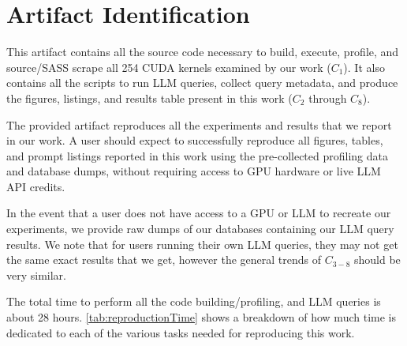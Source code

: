 \section{Artifact Identification}


\newartifact

\artrel
This artifact contains all the source code necessary to build, execute, profile, and source/SASS scrape all 254 CUDA kernels examined by our work ($C_1$).
It also contains all the scripts to run LLM queries, collect query metadata, and produce the figures, listings, and results table present in this work ($C_2$ through $C_8$).


\artexp

The provided artifact reproduces all the experiments and results that we report in our work.
A user should expect to successfully reproduce all figures, tables, and prompt listings reported in this work using the pre-collected profiling data and database dumps, without requiring access to GPU hardware or live LLM API credits.

In the event that a user does not have access to a GPU or LLM to recreate our experiments, we provide raw dumps of our databases containing our LLM query results.
We note that for users running their own LLM queries, they may not get the same exact results that we get, however the general trends of $C_{3-8}$ should be very similar.

% 









\arttime
The total time to perform all the code building/profiling, and LLM queries is about 28 hours. 
\autoref{tab:reproductionTime} shows a breakdown of how much time is dedicated to each of the various tasks needed for reproducing this work.

